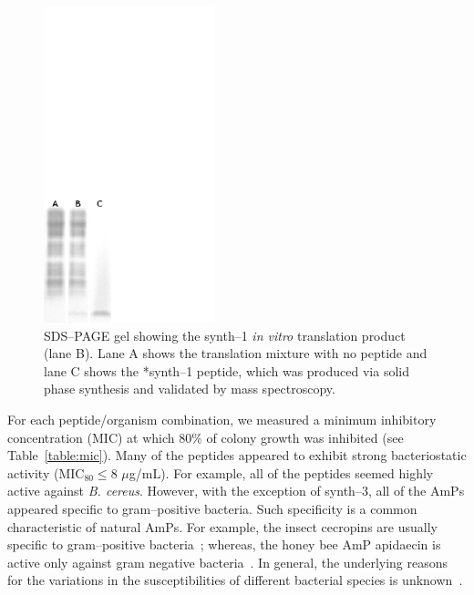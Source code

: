         \begin{figure}
        \centering
        \includegraphics{Body/Images-chap2/control-gel.pdf}
        \caption[Gel picture]{SDS--PAGE gel showing the synth--1
        \emph{in vitro} translation product (lane B).  Lane
        A shows the translation mixture with no peptide and
        lane C shows the *synth--1 peptide, which was produced
        via solid phase synthesis and validated by mass
        spectroscopy.}
        \label{fig:gel}
    \end{figure}






    For each peptide/organism combination, we measured a minimum
    inhibitory concentration (MIC) at which 80\% of colony growth
    was inhibited (see Table~\ref{table:mic}).
    Many of the peptides appeared to exhibit strong bacteriostatic activity
    (MIC$_{80}\leq8$ $\mu$g/mL).  For example, all of the peptides
    seemed highly active against \emph{B. cereus}.  However, with
    the exception of synth--3, all of the AmPs appeared specific to
    gram--positive bacteria.  Such specificity is a common characteristic
    of natural AmPs.  For example, the insect cecropins are usually
    specific to gram--positive bacteria~\cite{shai2002mode}; whereas,
    the honey bee AmP apidaecin is active only against gram negative
    bacteria~\cite{casteels1994apidaecin}.  In general, the underlying
    reasons for the variations in the susceptibilities of different
    bacterial species is unknown~\cite{zasloff2002antimicrobial}.



